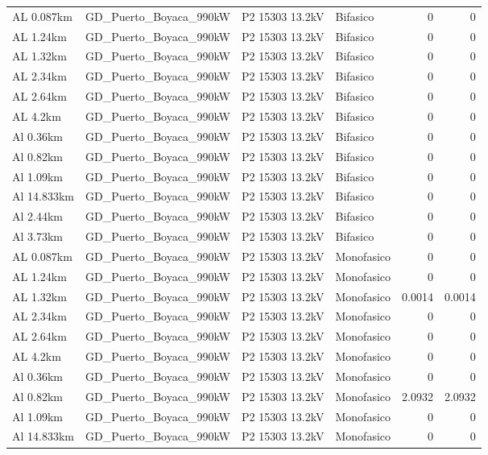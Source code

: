 \documentclass[11pt,a4paper]{article}
\begin{document}
\begin{longtable}{llllrr}
AL 0.087km & GD\_Puerto\_Boyaca\_990kW & P2 15303 13.2kV & Bifasico & 0 & 0 \\
AL 1.24km & GD\_Puerto\_Boyaca\_990kW & P2 15303 13.2kV & Bifasico & 0 & 0 \\
AL 1.32km & GD\_Puerto\_Boyaca\_990kW & P2 15303 13.2kV & Bifasico & 0 & 0 \\
AL 2.34km & GD\_Puerto\_Boyaca\_990kW & P2 15303 13.2kV & Bifasico & 0 & 0 \\
AL 2.64km & GD\_Puerto\_Boyaca\_990kW & P2 15303 13.2kV & Bifasico & 0 & 0 \\
AL 4.2km & GD\_Puerto\_Boyaca\_990kW & P2 15303 13.2kV & Bifasico & 0 & 0 \\
Al 0.36km & GD\_Puerto\_Boyaca\_990kW & P2 15303 13.2kV & Bifasico & 0 & 0 \\
Al 0.82km & GD\_Puerto\_Boyaca\_990kW & P2 15303 13.2kV & Bifasico & 0 & 0 \\
Al 1.09km & GD\_Puerto\_Boyaca\_990kW & P2 15303 13.2kV & Bifasico & 0 & 0 \\
Al 14.833km & GD\_Puerto\_Boyaca\_990kW & P2 15303 13.2kV & Bifasico & 0 & 0 \\
Al 2.44km & GD\_Puerto\_Boyaca\_990kW & P2 15303 13.2kV & Bifasico & 0 & 0 \\
Al 3.73km & GD\_Puerto\_Boyaca\_990kW & P2 15303 13.2kV & Bifasico & 0 & 0 \\
AL 0.087km & GD\_Puerto\_Boyaca\_990kW & P2 15303 13.2kV & Monofasico & 0 & 0 \\
AL 1.24km & GD\_Puerto\_Boyaca\_990kW & P2 15303 13.2kV & Monofasico & 0 & 0 \\
AL 1.32km & GD\_Puerto\_Boyaca\_990kW & P2 15303 13.2kV & Monofasico & 0.0014 & 0.0014 \\
AL 2.34km & GD\_Puerto\_Boyaca\_990kW & P2 15303 13.2kV & Monofasico & 0 & 0 \\
AL 2.64km & GD\_Puerto\_Boyaca\_990kW & P2 15303 13.2kV & Monofasico & 0 & 0 \\
AL 4.2km & GD\_Puerto\_Boyaca\_990kW & P2 15303 13.2kV & Monofasico & 0 & 0 \\
Al 0.36km & GD\_Puerto\_Boyaca\_990kW & P2 15303 13.2kV & Monofasico & 0 & 0 \\
Al 0.82km & GD\_Puerto\_Boyaca\_990kW & P2 15303 13.2kV & Monofasico & 2.0932 & 2.0932 \\
Al 1.09km & GD\_Puerto\_Boyaca\_990kW & P2 15303 13.2kV & Monofasico & 0 & 0 \\
Al 14.833km & GD\_Puerto\_Boyaca\_990kW & P2 15303 13.2kV & Monofasico & 0 & 0 \\

\end{longtable}
\end{document}
